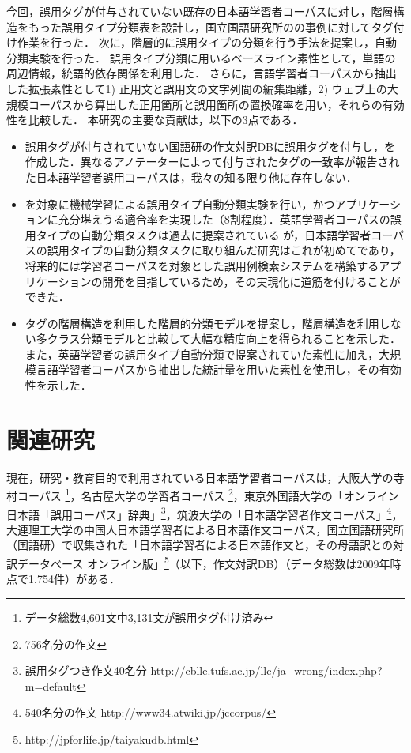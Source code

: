 \documentclass[japanese]{jnlp_1.4}
\newcommand{\ty}{}
\newcommand{\ngc}{}
\begin{document}
今回，誤用タグが付与されていない既存の日本語学習者コーパスに対し，階層構造をもった誤用タイプ分類表を設計し，国立国語研究所の\ty\hbox{}の事例に対してタグ付け作業を行った．
次に，階層的に誤用タイプの分類を行う手法を提案し，自動分類実験を行った．
誤用タイプ分類に用いるベースライン素性として，単語の周辺情報，統語的依存関係を利用した．
さらに，言語学習者コーパスから抽出した拡張素性として1) 正用文と誤用文の文字列間の編集距離，2) ウェブ上の大規模コーパスから算出した正用箇所と誤用箇所の置換確率を用い，それらの有効性を比較した．
本研究の主要な貢献は，以下の3点である．

\begin{itemize}
\item 誤用タグが付与されていない国語研の作文対訳DBに誤用タグを付与し，\ngc\hbox{}を作成した．異なるアノテーターによって付与されたタグの一致率が報告された日本語学習者誤用コーパスは，我々の知る限り他に存在しない．
\item \ngc\hbox{}を対象に機械学習による誤用タイプ自動分類実験を行い，かつアプリケーションに充分堪えうる適合率を実現した（8割程度）．英語学習者コーパスの誤用タイプの自動分類タスクは過去に提案されている \cite{swanson}が，日本語学習者コーパスの誤用タイプの自動分類タスクに取り組んだ研究はこれが初めてであり，将来的には学習者コーパスを対象とした誤用例検索システムを構築するアプリケーションの開発を目指しているため，その実現化に道筋を付けることができた．
\item タグの階層構造を利用した階層的分類モデルを提案し，階層構造を利用しない多クラス分類モデルと比較して大幅な精度向上を得られることを示した．また，英語学習者の誤用タイプ自動分類で提案されていた素性に加え，大規模言語学習者コーパスから抽出した統計量を用いた素性を使用し，その有効性を示した．
\end{itemize}


\section{関連研究}

現在，研究・教育目的で利用されている日本語学習者コーパスは，大阪大学の寺村コーパス \cite{teramuraj}\footnote{データ総数4,601文中3,131文が誤用タグ付け済み}，名古屋大学の学習者コーパス \cite{oso/97}\footnote{756名分の作文}，東京外国語大学の「オンライン日本語「誤用コーパス」辞典」\footnote{誤用タグつき作文40名分 http://cblle.tufs.ac.jp/llc/ja\_wrong/index.php?m=default}，筑波大学の「日本語学習者作文コーパス」\cite{rijehoj/2012}\footnote{540名分の作文 http://www34.atwiki.jp/jccorpus/}，大連理工大学の中国人日本語学習者による日本語作文コーパス\cite{shimizu/2004}，国立国語研究所（国語研）で収集された「日本語学習者による日本語作文と，その母語訳との対訳データベース オンライン版」\footnote{http://jpforlife.jp/taiyakudb.html}（以下，作文対訳DB）（データ総数は2009年時点で1,754件）がある．
\end{document}
